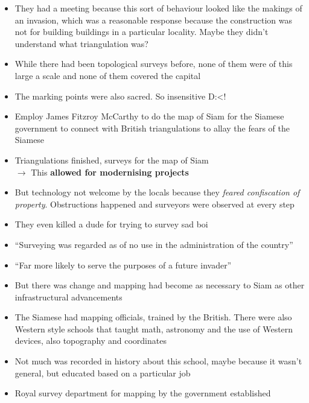 \documentclass[a4paper]{article}
\begin{document}
\begin{itemize}
\begin{itemize}[label=$\circ$]
		\item They had a meeting because this sort of behaviour looked like the makings of an invasion, which was a reasonable response because the construction was not for building buildings in a particular locality. Maybe they didn’t understand what triangulation was?
		\item While there had been topological surveys before, none of them were of this large a scale and none of them covered the capital 
		\item The marking points were also sacred. So insensitive D:<!
		\item Employ James Fitzroy McCarthy to do the map of Siam for the Siamese government to connect with British triangulations to allay the fears of the Siamese
		\item Triangulations finished, surveys for the map of Siam \\ $\rightarrow$ This \textbf{allowed for modernising projects}
		\item But technology not welcome by the locals because they \textit{feared confiscation of property}. Obstructions happened and surveyors were observed at every step
		\item They even killed a dude for trying to survey sad boi
		\item ``Surveying was regarded as of no use in the administration of the country''
		\item ``Far more likely to serve the purposes of a future invader''
		\item But there was change and mapping had become as necessary to Siam as other infrastructural advancements
		\item The Siamese had mapping officials, trained by the British. There were also Western style schools that taught math, astronomy and the use of Western devices, also topography and coordinates
		\item Not much was recorded in history about this school, maybe because it wasn't general, but educated based on a particular job
		\item Royal survey department for mapping by the government established
	\end{itemize}
\end{itemize}
\end{document}

